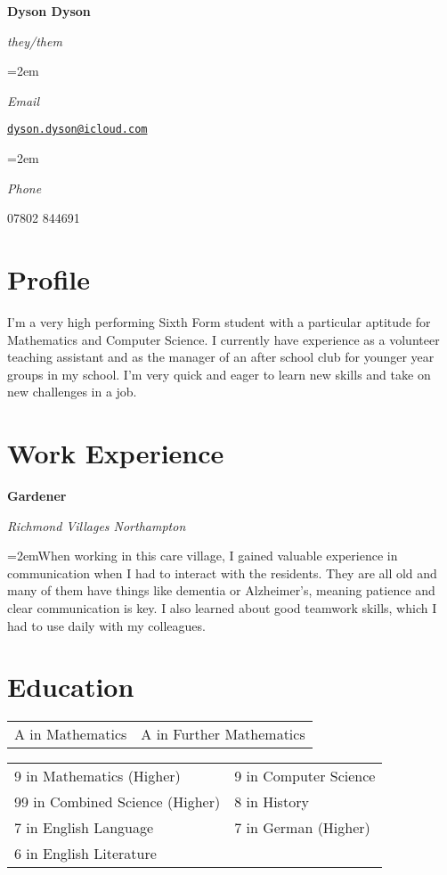 \documentclass[a4paper, 12pt]{article}
\newlength{\spacebox}
\newcommand{\sepspace}{\vspace*{1em}}
\newcommand{\name}[1]{
	\Huge
	\begin{center}\textbf{#1}\end{center}\par
	\normalsize}
\newcommand{\pronouns}[1]{
	\normalsize
	\begin{center}\textsl{#1}\end{center}\par}
\newcommand{\info}[2]{
	\noindent\hangindent=2em\hangafter=0
	\parbox{\spacebox}{%
		\textsl{#1}}
	#2\par}
\newcommand{\work}[4]{
	\noindent\textbf{#1}
	\hfill
	\framebox{%
		\parbox{6em}{%
			\centering\textbf{#2}}}\par
	\noindent\textsl{#3}\par
	\vspace*{0.5em}
	\noindent\hangindent=2em\hangafter=0\small #4
	\normalsize\par}
\begin{document}
\name{Dyson Dyson}
\vspace*{-1.5em}
\pronouns{they/them}

\sepspace

\info{Email}{\href{mailto:dyson.dyson@icloud.com}{\texttt{dyson.dyson@icloud.com}}}
\info{Phone}{07802 844691}

\section*{Profile}
I'm a very high performing Sixth Form student with a particular aptitude for Mathematics and Computer Science. I currently have experience as a volunteer teaching assistant and as the manager of an after school club for younger year groups in my school. I'm very quick and eager to learn new skills and take on new challenges in a job.

\section*{Work Experience}

\work{Gardener}{July 2022 - Present}{Richmond Villages Northampton}{When working in this care village, I gained valuable experience in communication when I had to interact with the residents. They are all old and many of them have things like dementia or Alzheimer's, meaning patience and clear communication is key. I also learned about good teamwork skills, which I had to use daily with my colleagues.}

\section*{Education}

\begin{center}
\end{center}

\begin{center}
	\begin{tabular}{m{12em} m{12em}}
		A in Mathematics & A in Further Mathematics
	\end{tabular}
\end{center}

\begin{center}
\end{center}

\begin{center}
	\begin{tabular}{m{16em} m{10em}}
		9 in Mathematics (Higher) & 9 in Computer Science \\
		99 in Combined Science (Higher) & 8 in History \\
		7 in English Language & 7 in German (Higher) \\
		6 in English Literature
	\end{tabular}
\end{center}
\end{document}
